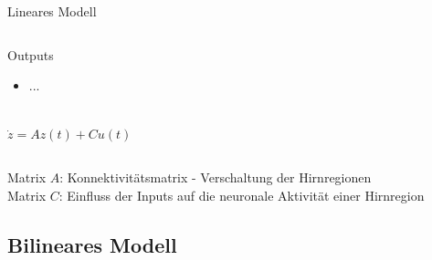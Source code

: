 \documentclass{beamer}
\begin{document}
\begin{frame}{Lineares Modell}
\begin{columns}
\begin{center}
{\begin{minipage}{\textwidth}
\begin{block}{Outputs}
\begin{itemize}
						\item ...
						\end{itemize}
					\end{block}
					\end{minipage}
				}\\
				\vspace{0.5cm}
				$\dot{z}=A z(t)+C u(t)$ 
			\end{center}
		\end{columns}	
		\vspace{0.5cm}
		\begin{small}
		Matrix $A$: Konnektivitätsmatrix - Verschaltung der Hirnregionen \\
		Matrix $C$: Einfluss der Inputs auf die neuronale Aktivität einer Hirnregion
	\end{small}		 
	\end{frame}
	
\subsection{Bilineares Modell}
	
\end{document}
